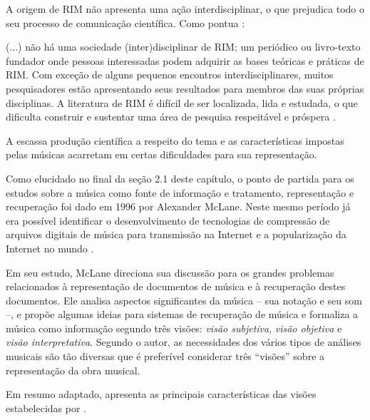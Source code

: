 A origem de RIM não apresenta uma ação interdisciplinar, o que prejudica todo o seu processo de comunicação científica. Como pontua :

\begin{citacao}
(...) não há uma sociedade (inter)disciplinar de RIM; um periódico ou livro-texto fundador onde pessoas interessadas podem adquirir as bases teóricas e práticas de RIM. Com exceção de alguns pequenos encontros interdisciplinares, muitos pesquisadores estão apresentando seus resultados para membros das suas próprias disciplinas. A literatura de RIM é difícil de ser localizada, lida e estudada, o que dificulta construir e sustentar uma área de pesquisa respeitável e próspera \cite{santini&souza2007}.
\end{citacao}

A escassa produção científica a respeito do tema e as características impostas pelas músicas acarretam em certas dificuldades para sua representação.

Como elucidado no final da seção 2.1 deste capítulo, o ponto de partida para os estudos sobre a música como fonte de informação e tratamento, representação e recuperação foi dado em 1996 por Alexander McLane. Neste mesmo período já era possível identificar o desenvolvimento de tecnologias de compressão de arquivos digitais de música para transmissão na Internet e a popularização da Internet no mundo \cite{santini&souza2007}.

Em seu estudo, McLane direciona sua discussão para os grandes problemas relacionados à representação de documentos de música e à recuperação destes documentos. Ele analisa aspectos significantes da música – sua notação e seu som –, e propõe algumas ideias para sistemas de recuperação de música e formaliza a música como informação segundo três visões: \textit{visão subjetiva}, \textit{visão objetiva} e \textit{visão interpretativa}. Segundo o autor, as necessidades dos vários tipos de análises musicais são tão diversas que é preferível considerar três “visões” sobre a representação da obra musical.

Em resumo adaptado,  apresenta as principais características das visões estabelecidas por .

